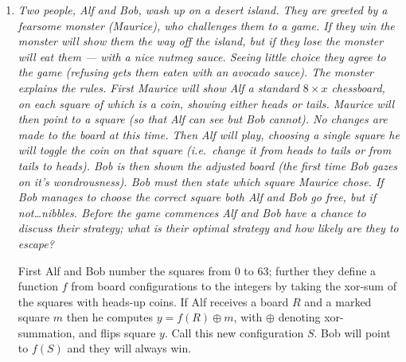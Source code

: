 \documentclass{article}
\begin{document}
\begin{enumerate}[1.]
\vspace{6pt}
\item %
{\itshape Two people, Alf and Bob, wash up on a desert island. They are greeted by a fearsome monster (Maurice), who challenges them to a game. If they win the monster will show them the way off the island, but if they lose the monster will eat them --- with a nice nutmeg sauce. Seeing little choice they agree to the game (refusing gets them eaten with an avocado sauce). The monster explains the rules. First Maurice will show Alf a standard $8 \times x$ chessboard, on each square of which is a coin, showing either heads or tails. Maurice will then point to a square (so that Alf can see but Bob cannot). No changes are made to the board at this time. Then Alf will play, choosing a single square he will toggle the coin on that square (i.e.\ change it from heads to tails or from tails to heads). Bob is then shown the adjusted board (the first time Bob gazes on it's wondrousness). Bob must then state which square Maurice chose. If Bob manages to choose the correct square both Alf and Bob go free, but if not\dots nibbles. Before the game commences Alf and Bob have a chance to discuss their strategy; what is their optimal strategy and how likely are they to escape?}

First Alf and Bob number the squares from 0 to 63; further they define a function $f$ from board configurations to the integers by taking the xor-sum of the squares with heads-up coins. If Alf receives a board $R$ and a marked square $m$ then he computes $y = f(R) \oplus m$, with $\oplus$ denoting xor-summation, and flips square  $y$. Call this new configuration $S$. Bob will point to $f(S)$ and they will always win.  
\end{enumerate}
\end{document}
